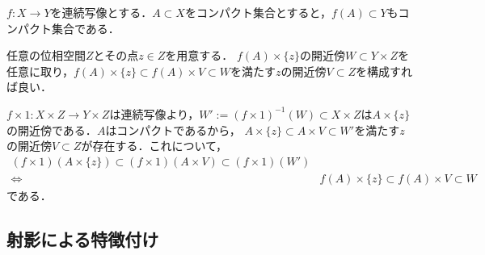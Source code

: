 \documentclass[uplatex,dvipdfmx]{jsreport}
\begin{document}
\begin{corollary}[連続写像はコンパクト性を保存する]\label{cor-image-of-compact-set-is-compact}
    $f:X\to Y$を連続写像とする．$A\subset X$をコンパクト集合とすると，$f(A)\subset Y$もコンパクト集合である．
\end{corollary}
\begin{Proof}
    任意の位相空間$Z$とその点$z\in Z$を用意する．
    $f(A)\times\{z\}$の開近傍$W\subset Y\times Z$を任意に取り，$f(A)\times\{z\}\subset f(A)\times V\subset W$を満たす$z$の開近傍$V\subset Z$を構成すれば良い．

    $f\times 1:X\times Z\to Y\times Z$は連続写像より，$W':=(f\times 1)^{-1}(W)\subset X\times Z$は$A\times\{z\}$の開近傍である．$A$はコンパクトであるから，
    $A\times\{z\}\subset A\times V\subset W'$を満たす$z$の開近傍$V\subset Z$が存在する．これについて，
    \begin{align*}
        (f\times 1)(A\times\{z\})\subset(f\times 1)(A\times V)\subset(f\times 1)(W')\\
        \Leftrightarrow\quad&f(A)\times\{z\}\subset f(A)\times V\subset W
    \end{align*}
    である．
\end{Proof}

\subsection{射影による特徴付け}
\end{document}
